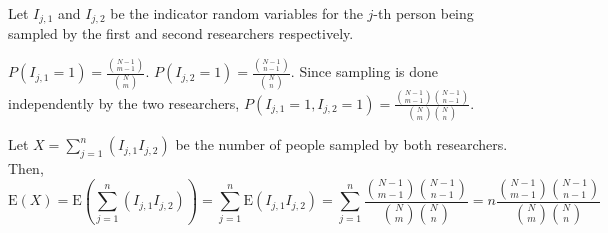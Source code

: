 Let $I_{j,1}$ and $I_{j,2}$ be the indicator random variables for the $j$-th
person being sampled by the first and second researchers respectively.

$P(I_{j,1} = 1) = \frac{\binom{N-1}{m-1}}{\binom{N}{m}}$. $P(I_{j,2} = 1) = 
\frac{\binom{N-1}{n-1}}{\binom{N}{n}}$. Since sampling is done independently by
the two researchers, $P(I_{j,1} = 1, I_{j,2} = 1) = \frac{\binom{N-1}{m-1}\binom{N-1}{n-1}}{
\binom{N}{m}\binom{N}{n}}$.

Let $X = \sum_{j=1}^{n}(I_{j,1}I_{j,2})$ be the number of people sampled by
both researchers. Then, $$\text{E}(X) = \text{E}(\sum_{j=1}^{n}(I_{j,1}I_{j,2})) =
\sum_{j=1}^{n}\text{E}(I_{j,1}I_{j,2}) = \sum_{j=1}^{n}\frac{\binom{N-1}{m-1}\binom{N-1}{n-1}}{
\binom{N}{m}\binom{N}{n}} = n\frac{\binom{N-1}{m-1}\binom{N-1}{n-1}}{
\binom{N}{m}\binom{N}{n}}$$